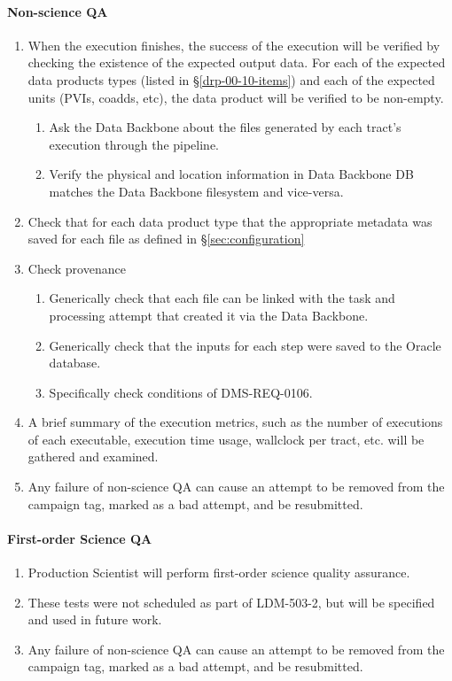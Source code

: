 \paragraph{Non-science QA}
\begin{enumerate}
  \item{When the execution finishes, the success of the execution will be verified by checking the existence of the expected output data.
  For each of the expected data products types (listed in \S\ref{drp-00-10-items})
  and each of the expected units (PVIs, coadds, etc), the data product will be
  verified to be non-empty.}
    \begin{enumerate}
        \item{Ask the Data Backbone about the files generated by each tract's execution through the pipeline.}
        \item{Verify the physical and location information in Data Backbone DB matches the Data Backbone filesystem and vice-versa.} 
    \end{enumerate}
  \item{Check that for each data product type that the appropriate metadata was saved for each file as defined in \S\ref{sec:configuration}}
  \item{Check provenance}
    \begin{enumerate}
        \item{Generically check that each file can be linked with the task and processing attempt that created it via the Data Backbone.}
        \item{Generically check that the inputs for each step were saved to the Oracle database.}
        \item{Specifically check conditions of DMS-REQ-0106.}
    \end{enumerate}
  \item{A brief summary of the execution metrics, such as the number of executions of each executable, execution time usage, wallclock per tract,
         etc. will be gathered and examined.}
  \item{Any failure of non-science QA can cause an attempt to be removed from the campaign tag, marked as a bad attempt, and be resubmitted.} 
\end{enumerate}

\paragraph{First-order Science QA}
\begin{enumerate}
  \item{Production Scientist will perform first-order science quality assurance.}
  \item{These tests were not scheduled as part of LDM-503-2, but will be specified and used in future work.}
  \item{Any failure of non-science QA can cause an attempt to be removed from the campaign tag, marked as a bad attempt, and be resubmitted.} 
\end{enumerate}
